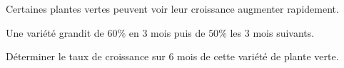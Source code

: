 \begin{exo}{}
	Certaines plantes vertes peuvent voir leur croissance augmenter rapidement.

	Une variété grandit de $60\%$ en $3$ mois puis de $50\%$ les $3$ mois suivants.


	Déterminer le taux de croissance sur $6$ mois de cette variété de plante verte.
\end{exo}

